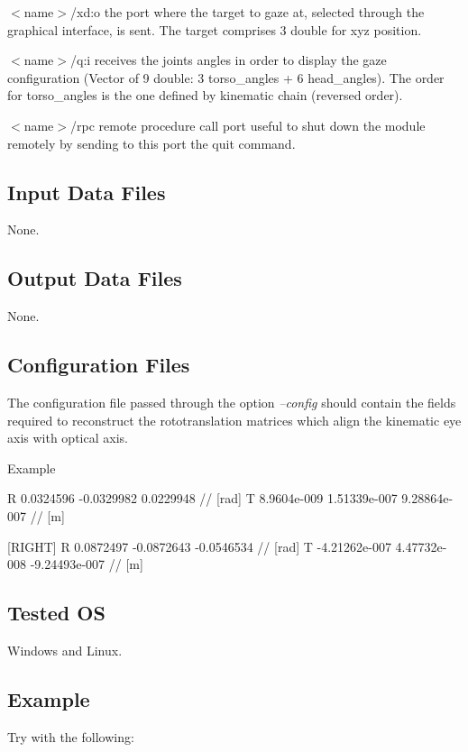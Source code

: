 \begin{DoxyItemize}
\item {\itshape } $<$name$>$/xd\+:o the port where the target to gaze at, selected through the graphical interface, is sent. The target comprises 3 double for xyz position.
\item {\itshape } $<$name$>$/q\+:i receives the joints angles in order to display the gaze configuration (Vector of 9 double\+: 3 torso\+\_\+angles + 6 head\+\_\+angles). The order for torso\+\_\+angles is the one defined by kinematic chain (reversed order).
\item {\itshape } $<$name$>$/rpc remote procedure call port useful to shut down the module remotely by sending to this port the \textquotesingle{}quit\textquotesingle{} command.
\end{DoxyItemize}\hypertarget{group__icub__signalScope_in_files_sec}{}\subsection{Input Data Files}\label{group__icub__signalScope_in_files_sec}
None.\hypertarget{group__icub__signalScope_out_data_sec}{}\subsection{Output Data Files}\label{group__icub__signalScope_out_data_sec}
None.\hypertarget{group__icub__signalScope_conf_file_sec}{}\subsection{Configuration Files}\label{group__icub__signalScope_conf_file_sec}
The configuration file passed through the option {\itshape --config} should contain the fields required to reconstruct the rototranslation matrices which align the kinematic eye axis with optical axis.

Example


\begin{DoxyCode}
[LEFT]
R      0.0324596 -0.0329982 0.0229948               \textcolor{comment}{// [rad]}
T      8.9604e-009 1.51339e-007 9.28864e-007        \textcolor{comment}{// [m]}

[RIGHT]
R      0.0872497 -0.0872643 -0.0546534              \textcolor{comment}{// [rad]}
T      -4.21262e-007 4.47732e-008 -9.24493e-007     \textcolor{comment}{// [m]}
\end{DoxyCode}
\hypertarget{group__icub__tld_tested_os_sec}{}\subsection{Tested O\+S}\label{group__icub__tld_tested_os_sec}
Windows and Linux.\hypertarget{group__icub__signalScope_example_sec}{}\subsection{Example}\label{group__icub__signalScope_example_sec}
Try with the following\+:


